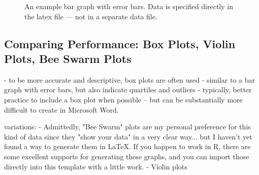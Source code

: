 \begin{figure}[b!]
\caption{An example bar graph with error bars. Data is specified directly in the latex file --- not in a separate data file.}
\label{fig:bargraph}
\end{figure}






\newpage
\subsection{Comparing Performance: Box Plots, Violin Plots, Bee Swarm Plots}


- to be more accurate and descriptive, box plots are often used
- similar to a bar graph with error bars, but also indicate quartiles and outliers 
- typically, better practice to include a box plot when possible -- but can be substantially more difficult to create in Microsoft Word. 

variations: 
- Admittedly, "Bee Swarm" plots are my personal preference for this kind of data since they "show your data" in a very clear way... but I haven't yet found a  way to generate them in \LaTeX. If you happen to work in R, there are some excellent supports for generating these graphs, and you can import those directly into this template with a little work. 
- Violin plots 


